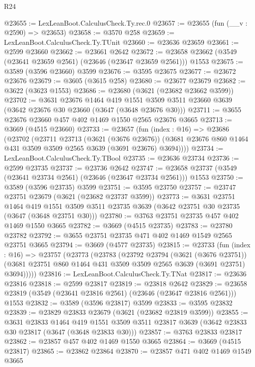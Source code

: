 \begin{lexlean}{R24}
\begin{coremodule}
@23655 := LexLeanBoot.CalculusCheck.Ty.rec.{0}
@23657 := @23655 (fun (__v : @2590) => @23653)
@23658 := @3570 @258
@23659 := LexLeanBoot.CalculusCheck.Ty.TUnit
@23660 := @23636 @23659
@23661 := @2599 @23660
@23662 := @23661 @2642
@23672 := @23658 @23662 (@3549 (@23641 @23659 @2561) (@23646 (@23647 @23659 @2561))) @1553
@23675 := @3589 (@3596 @23660) @3599
@23676 := @3595 @23675
@23677 := @23672 @23676
@23679 := @3605 (@3615 @258)
@23680 := @23677 @23679
@23682 := @3622 (@3623 @1553)
@23686 := @23680 (@3621 (@23682 @23662 @3599))
@23702 := @3631
    @23676
    @1464
    @419
    @1551
    @3509
    @3511
    @23660
    @3639
    (@3642 @23676 @30 @23660 (@3647 (@3648 @23676 @30)))
@23711 := @3655 @23676 @23660 @457 @402 @1469 @1550 @2565 @23676 @3665
@23713 := @3669 (@4515 @23660)
@23733 := @23657
    (fun (index : @16) =>
    @23686
      (@23702
        (@23711
          @23713
          (@3621 (@3676 @23676))
          (@3681 @23676 @860 @1464 @431 @3509 @3509 @2565 @3639 (@3691 @23676) @3694))))
@23734 := LexLeanBoot.CalculusCheck.Ty.TBool
@23735 := @23636 @23734
@23736 := @2599 @23735
@23737 := @23736 @2642
@23747 := @23658 @23737 (@3549 (@23641 @23734 @2561) (@23646 (@23647 @23734 @2561))) @1553
@23750 := @3589 (@3596 @23735) @3599
@23751 := @3595 @23750
@23757 := @23747 @23751 @23679 (@3621 (@23682 @23737 @3599))
@23773 := @3631
    @23751
    @1464
    @419
    @1551
    @3509
    @3511
    @23735
    @3639
    (@3642 @23751 @30 @23735 (@3647 (@3648 @23751 @30)))
@23780 := @3763 @23751 @23735 @457 @402 @1469 @1550 @3665
@23782 := @3669 (@4515 @23735)
@23783 := @23780 @23782
@23792 := @3655 @23751 @23735 @471 @402 @1469 @1549 @2565 @23751 @3665
@23794 := @3669 (@4577 @23735)
@23815 := @23733
    (fun (index : @16) =>
    @23757
      (@23773
        (@23783
          (@23792
            @23794
            (@3621 (@3676 @23751))
            (@3681 @23751 @860 @1464 @431 @3509 @3509 @2565 @3639 (@3691 @23751) @3694)))))
@23816 := LexLeanBoot.CalculusCheck.Ty.TNat
@23817 := @23636 @23816
@23818 := @2599 @23817
@23819 := @23818 @2642
@23829 := @23658 @23819 (@3549 (@23641 @23816 @2561) (@23646 (@23647 @23816 @2561))) @1553
@23832 := @3589 (@3596 @23817) @3599
@23833 := @3595 @23832
@23839 := @23829 @23833 @23679 (@3621 (@23682 @23819 @3599))
@23855 := @3631
    @23833
    @1464
    @419
    @1551
    @3509
    @3511
    @23817
    @3639
    (@3642 @23833 @30 @23817 (@3647 (@3648 @23833 @30)))
@23857 := @3763 @23833 @23817
@23862 := @23857 @457 @402 @1469 @1550 @3665
@23864 := @3669 (@4515 @23817)
@23865 := @23862 @23864
@23870 := @23857 @471 @402 @1469 @1549 @3665

\end{coremodule}
\end{lexlean}
